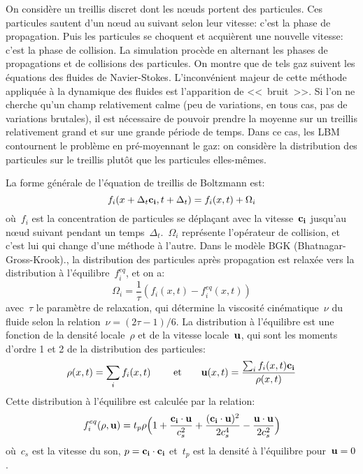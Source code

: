 On considère un treillis discret dont les nœuds portent des particules. Ces particules sautent d'un nœud au suivant selon leur vitesse: c'est la phase de propagation. Puis les particules se choquent et acquièrent une nouvelle vitesse: c'est la phase de collision. La simulation procède en alternant les phases de propagations et de collisions des particules. On montre que de tels gaz suivent les équations des fluides de Navier-Stokes. L'inconvénient majeur de cette méthode appliquée à la dynamique des fluides est l'apparition de <<~bruit~>>. Si l'on ne cherche qu'un champ relativement calme (peu de variations, en tous cas, pas de variations brutales), il est nécessaire de pouvoir prendre la moyenne sur un treillis relativement grand et sur une grande période de temps. Dans ce cas, les LBM contournent le problème en pré-moyennant le gaz: on considère la distribution des particules sur le treillis plutôt que les particules elles-mêmes.

\medskip
La forme générale de l'équation de treillis de Boltzmann est:
\begin{equation}
f_i(x+\Delta_t \mathbf{c_i}, t+\Delta_t) = f_i(x,t) + \Omega_i
\end{equation}
où~$f_i$ est la concentration de particules se déplaçant avec la vitesse~$\mathbf{c_i}$ jusqu'au nœud suivant pendant un temps~$\Delta_t$.~$\Omega_i$ représente l'opérateur de collision, et c'est lui qui change d'une méthode à l'autre. Dans le modèle BGK (Bhatnagar-Gross-Krook)., la distribution des particules après propagation est relaxée vers la distribution à l'équilibre~$f_i^{eq}$, et on a:
\begin{equation}
\Omega_i = \frac1{\tau}\left(f_i(x,t)-f_i^{eq}(x,t)\right)
\end{equation}
avec~$\tau$ le paramètre de relaxation, qui détermine la viscosité cinématique~$\nu$ du fluide selon la relation~$\nu=(2\tau -1)/6$. La distribution à l'équilibre est une fonction de la densité locale~$\rho$ et de la vitesse locale~$\mathbf{u}$, qui sont les moments d'ordre 1 et 2 de la distribution des particules:
\begin{equation}
\rho(x,t) = \displaystyle\sum_i f_i(x,t) \qquad\text{ et}\qquad \mathbf{u}(x,t)=\dfrac{\sum_i f_i(x,t)\mathbf{c_i}}{\rho(x,t)}
\end{equation}
Cette distribution à l'équilibre est calculée par la relation:
\begin{equation}
f_i^{eq}(\rho,\mathbf{u}) = t_p \rho \Bigl(1+\dfrac{\mathbf{c_i}\cdot\mathbf{u}}{c_s^2} + \dfrac{(\mathbf{c_i}\cdot\mathbf{u})^2}{2c_s^4} - \dfrac{\mathbf{u}\cdot\mathbf{u}}{2c_s^2}\Bigr)
\end{equation}
où~$c_s$ est la vitesse du son, $p=\mathbf{c_i}\cdot\mathbf{c_i}$ et~$t_p$ est la densité à l'équilibre pour~$\mathbf{u}=0$.






